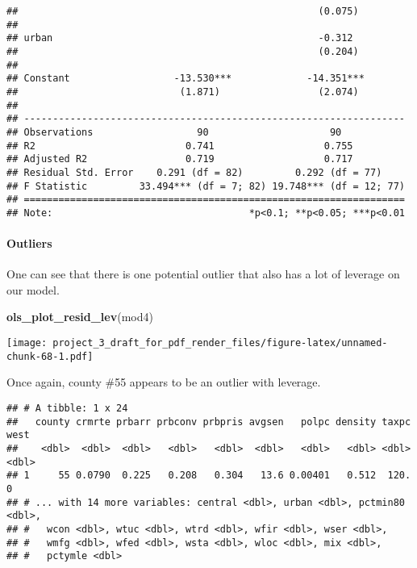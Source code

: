 \documentclass[]{article}
\newenvironment{Shaded}{\begin{snugshade}}{\end{snugshade}}
\newcommand{\DecValTok}[1]{\textcolor[rgb]{0.00,0.00,0.81}{#1}}
\newcommand{\KeywordTok}[1]{\textcolor[rgb]{0.13,0.29,0.53}{\textbf{#1}}}
\newcommand{\NormalTok}[1]{#1}
\newcommand{\OperatorTok}[1]{\textcolor[rgb]{0.81,0.36,0.00}{\textbf{#1}}}
\newcommand{\StringTok}[1]{\textcolor[rgb]{0.31,0.60,0.02}{#1}}
\let\oldparagraph\paragraph
\renewcommand{\paragraph}[1]{\oldparagraph{#1}\mbox{}}
\begin{document}
\begin{verbatim}
##                                                    (0.075)        
##                                                                   
## urban                                              -0.312         
##                                                    (0.204)        
##                                                                   
## Constant                  -13.530***             -14.351***       
##                            (1.871)                 (2.074)        
##                                                                   
## ------------------------------------------------------------------
## Observations                  90                     90           
## R2                          0.741                   0.755         
## Adjusted R2                 0.719                   0.717         
## Residual Std. Error    0.291 (df = 82)         0.292 (df = 77)    
## F Statistic         33.494*** (df = 7; 82) 19.748*** (df = 12; 77)
## ==================================================================
## Note:                                  *p<0.1; **p<0.05; ***p<0.01
\end{verbatim}

\hypertarget{outliers-3}{%
\paragraph{Outliers}\label{outliers-3}}

One can see that there is one potential outlier that also has a lot of
leverage on our model.

\begin{Shaded}
\begin{Highlighting}[]
\KeywordTok{ols_plot_resid_lev}\NormalTok{(mod4)}
\end{Highlighting}
\end{Shaded}

\texttt{[image: project\_3\_draft\_for\_pdf\_render\_files/figure-latex/unnamed-chunk-68-1.pdf]}

Once again, county \#55 appears to be an outlier with leverage.

\begin{Shaded}
\end{Shaded}

\begin{verbatim}
## # A tibble: 1 x 24
##   county crmrte prbarr prbconv prbpris avgsen   polpc density taxpc  west
##    <dbl>  <dbl>  <dbl>   <dbl>   <dbl>  <dbl>   <dbl>   <dbl> <dbl> <dbl>
## 1     55 0.0790  0.225   0.208   0.304   13.6 0.00401   0.512  120.     0
## # ... with 14 more variables: central <dbl>, urban <dbl>, pctmin80 <dbl>,
## #   wcon <dbl>, wtuc <dbl>, wtrd <dbl>, wfir <dbl>, wser <dbl>,
## #   wmfg <dbl>, wfed <dbl>, wsta <dbl>, wloc <dbl>, mix <dbl>,
## #   pctymle <dbl>
\end{verbatim}
\end{document}
